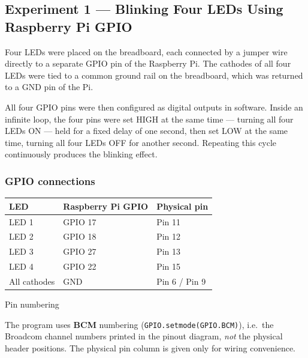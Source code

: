 \documentclass[10pt,a4paper]{article}
\begin{document}
\subsection{Experiment 1 --- Blinking Four LEDs Using Raspberry Pi GPIO}

Four LEDs were placed on the breadboard, each connected by a jumper wire
directly to a separate GPIO pin of the Raspberry Pi. The
cathodes of all four LEDs were tied to a common ground rail on the breadboard,
which was returned to a GND pin of the Pi.

All four GPIO pins were then configured as digital outputs in software. Inside an
infinite loop, the four pins were set HIGH at the same time --- turning all four
LEDs ON --- held for a fixed delay of one second, then set LOW at the same time,
turning all four LEDs OFF for another second. Repeating this cycle continuously
produces the blinking effect.

\subsubsection{GPIO connections}

\vspace{2pt}
\noindent
\begin{minipage}[t]{0.45\textwidth}
\vspace{0pt}
\begin{tabularx}{\linewidth}{@{}l l X@{}}
\toprule
\rowcolor{soft}
\textbf{LED} & \textbf{Raspberry Pi GPIO} & \textbf{Physical pin} \\
\midrule
LED 1 & GPIO 17 & Pin 11 \\
LED 2 & GPIO 18 & Pin 12 \\
LED 3 & GPIO 27 & Pin 13 \\
LED 4 & GPIO 22 & Pin 15 \\
\midrule
All cathodes & GND & Pin 6 / Pin 9 \\
\bottomrule
\end{tabularx}
\end{minipage}\hfill
\begin{minipage}[t]{0.52\textwidth}
\vspace{0pt}
\begin{titledbox}{Pin numbering}
\raggedright
The program uses \textbf{BCM} numbering (\texttt{GPIO.setmode(GPIO.BCM)}), i.e.\ the
Broadcom channel numbers printed in the pinout diagram, \emph{not} the physical
header positions. The physical pin column is given only for wiring convenience.
\end{titledbox}
\end{minipage}
\end{document}
